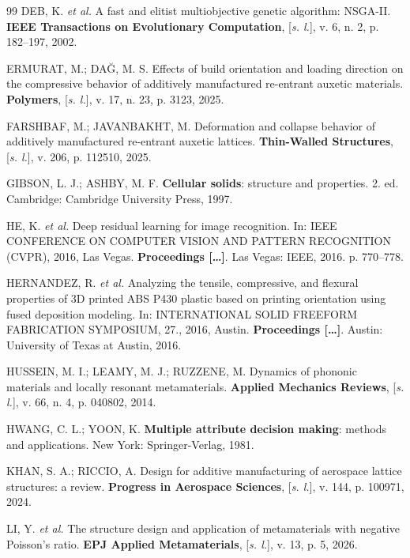 \begin{thebibliography}{99}
DEB, K. \textit{et al.} A fast and elitist multiobjective genetic algorithm: NSGA-II. \textbf{IEEE Transactions on Evolutionary Computation}, [\textit{s. l.}], v. 6, n. 2, p. 182--197, 2002.

ERMURAT, M.; DA\u{G}, M. S. Effects of build orientation and loading direction on the compressive behavior of additively manufactured re-entrant auxetic materials. \textbf{Polymers}, [\textit{s. l.}], v. 17, n. 23, p. 3123, 2025.

FARSHBAF, M.; JAVANBAKHT, M. Deformation and collapse behavior of additively manufactured re-entrant auxetic lattices. \textbf{Thin-Walled Structures}, [\textit{s. l.}], v. 206, p. 112510, 2025.

GIBSON, L. J.; ASHBY, M. F. \textbf{Cellular solids}: structure and properties. 2. ed. Cambridge: Cambridge University Press, 1997.

HE, K. \textit{et al.} Deep residual learning for image recognition. In: IEEE CONFERENCE ON COMPUTER VISION AND PATTERN RECOGNITION (CVPR), 2016, Las Vegas. \textbf{Proceedings [\ldots]}. Las Vegas: IEEE, 2016. p. 770--778.

HERNANDEZ, R. \textit{et al.} Analyzing the tensile, compressive, and flexural properties of 3D printed ABS P430 plastic based on printing orientation using fused deposition modeling. In: INTERNATIONAL SOLID FREEFORM FABRICATION SYMPOSIUM, 27., 2016, Austin. \textbf{Proceedings [\ldots]}. Austin: University of Texas at Austin, 2016.

HUSSEIN, M. I.; LEAMY, M. J.; RUZZENE, M. Dynamics of phononic materials and locally resonant metamaterials. \textbf{Applied Mechanics Reviews}, [\textit{s. l.}], v. 66, n. 4, p. 040802, 2014.

HWANG, C. L.; YOON, K. \textbf{Multiple attribute decision making}: methods and applications. New York: Springer-Verlag, 1981.

KHAN, S. A.; RICCIO, A. Design for additive manufacturing of aerospace lattice structures: a review. \textbf{Progress in Aerospace Sciences}, [\textit{s. l.}], v. 144, p. 100971, 2024.

LI, Y. \textit{et al.} The structure design and application of metamaterials with negative Poisson's ratio. \textbf{EPJ Applied Metamaterials}, [\textit{s. l.}], v. 13, p. 5, 2026.


\end{thebibliography}
